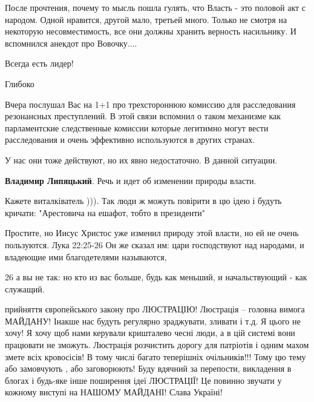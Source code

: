 \begin{itemize}

После прочтения, почему то мысль пошла гулять, что Власть - это половой акт с
народом. Одной нравится, другой мало, третьей много. Только не смотря на
некоторую несовместимость, все они должны хранить верность насильнику. И
вспомнился анекдот про Вовочку....

Всегда есть лидер!

Глибоко


Вчера послушал Вас на 1+1 про трехстороннюю комиссию для расследования
резонансных преступлений. В этой связи вспомнил о таком механизме как
парламентские следственные комиссии которые легитимно могут вести расследования
и очень эффективно используются в других странах.

У нас они тоже действуют, но их явно недостаточно. В данной ситуации.

\textbf{Владимир Липяцький}. Речь и идет об изменении природы власти.

Кажете виталківатель ))). Так люди ж можуть повірити в цю ідею і будуть кричати: "Арестовича на ешафот, тобто в президенти"


Простите, но Иисус Христос уже изменил природу этой власти, но ей не очень
пользуются. Лука 22:25-26 Он же сказал им: цари господствуют над народами, и
владеющие ими благодетелями называются,

26 а вы не так: но кто из вас больше, будь как меньший, и начальствующий - как
служащий.


\obeycr
прийняття європейського закону про ЛЮСТРАЦІЮ!
Люстрація – головна вимога МАЙДАНУ!
Інакше нас будуть регулярно зраджувати, зливати і т.д.
Я цього не хочу!
Я хочу щоб нами керували кришталево чесні люди, а в цій системі вони працювати не зможуть.
Люстрація розчистить дорогу для патріотів і одним махом змете всіх кровосісів! В тому числі багато теперішніх очільників!!! Тому цю тему або замовчують , або заговорюють!
Буду вдячний за перепости, викладення в блогах і будь-яке інше поширення ідеї ЛЮСТРАЦІЇ!
Це повинно звучати у кожному виступі на НАШОМУ МАЙДАНІ!
Слава Україні!
\restorecr



\end{itemize}
